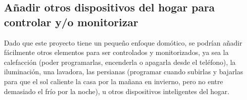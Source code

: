 \subsection{Añadir otros dispositivos del hogar para controlar y/o monitorizar}

Dado que este proyecto tiene un pequeño enfoque domótico, se podrían añadir fácilmente otros elementos para ser controlados y monitorizados, ya sea la calefacción (poder programarlas, encenderla o apagarla desde el teléfono), la iluminación, una lavadora, las persianas (programar cuando subirlas y bajarlas para que el sol caliente la casa por la mañana en invierno, pero no entre demasiado el frío por la noche), u otros dispositivos inteligentes del hogar.









